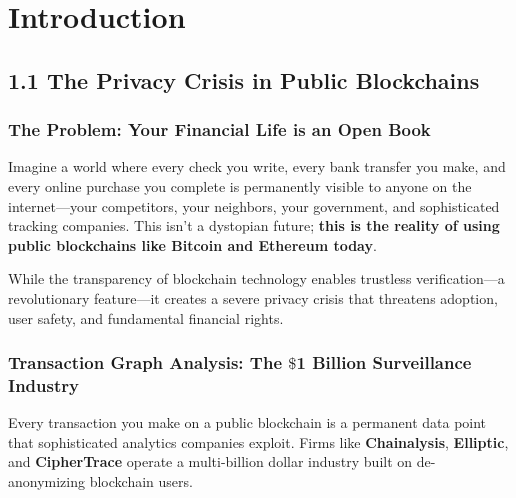 \documentclass[11pt,a4paper]{article}
\begin{document}
\newpage
\tableofcontents
\newpage

\section{Introduction}

\subsection{1.1 The Privacy Crisis in Public Blockchains}

\subsubsection{The Problem: Your Financial Life is an Open Book}

Imagine a world where every check you write, every bank transfer you make, and every online purchase you complete is permanently visible to anyone on the internet—your competitors, your neighbors, your government, and sophisticated tracking companies. This isn't a dystopian future; \textbf{this is the reality of using public blockchains like Bitcoin and Ethereum today}.

While the transparency of blockchain technology enables trustless verification—a revolutionary feature—it creates a severe privacy crisis that threatens adoption, user safety, and fundamental financial rights.

\subsubsection{Transaction Graph Analysis: The $\$$1 Billion Surveillance Industry}

Every transaction you make on a public blockchain is a permanent data point that sophisticated analytics companies exploit. Firms like \textbf{Chainalysis}, \textbf{Elliptic}, and \textbf{CipherTrace} operate a multi-billion dollar industry built on de-anonymizing blockchain users.
\end{document}
